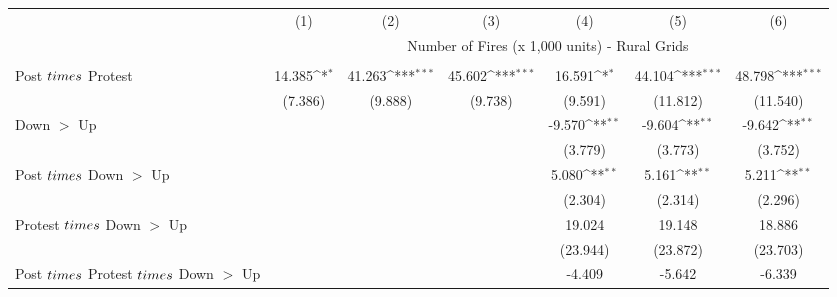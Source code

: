 {
\def\sym#1{\ifmmode^{#1}\else\(^{#1}\)\fi}
\begin{tabular}{l*{6}{c}}
\hline
            &\multicolumn{1}{c}{(1)}         &\multicolumn{1}{c}{(2)}         &\multicolumn{1}{c}{(3)}         &\multicolumn{1}{c}{(4)}         &\multicolumn{1}{c}{(5)}         &\multicolumn{1}{c}{(6)}         \\
            & \multicolumn{6}{c}{Number of Fires (x 1,000 units) - Rural Grids} \\ \hline
            &                     &                     &                     &                     &                     &                     \\

Post $\\times$ Protest&      14.385\sym{*}  &      41.263\sym{***}&      45.602\sym{***}&      16.591\sym{*}  &      44.104\sym{***}&      48.798\sym{***}\\
            &     (7.386)         &     (9.888)         &     (9.738)         &     (9.591)         &    (11.812)         &    (11.540)         \\
Down $>$ Up &                     &                     &                     &      -9.570\sym{**} &      -9.604\sym{**} &      -9.642\sym{**} \\
            &                     &                     &                     &     (3.779)         &     (3.773)         &     (3.752)         \\
Post $\\times$ Down $>$ Up&                     &                     &                     &       5.080\sym{**} &       5.161\sym{**} &       5.211\sym{**} \\
            &                     &                     &                     &     (2.304)         &     (2.314)         &     (2.296)         \\
Protest $\\times$ Down $>$ Up&                     &                     &                     &      19.024         &      19.148         &      18.886         \\
            &                     &                     &                     &    (23.944)         &    (23.872)         &    (23.703)         \\
Post $\\times$ Protest $\\times$ Down $>$ Up&                     &                     &                     &      -4.409         &      -5.642         &      -6.339         \\

\end{tabular}}

